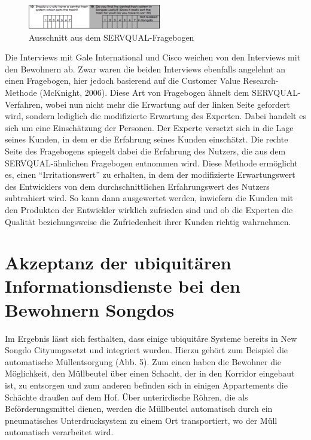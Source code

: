 \documentclass[a4paper,
fontsize=11pt,
oneside,
numbers=noperiodatend,
parskip=half-,
bibliography=totoc,
final
]{scrartcl}
\begin{document}
\begin{figure}[htbp]
\centering
\includegraphics{img/Abbildung3.jpg}
\caption{Ausschnitt aus dem SERVQUAL-Fragebogen}
\end{figure}

Die Interviews mit Gale International und Cisco weichen von den
Interviews mit den Bewohnern ab. Zwar waren die beiden Interviews
ebenfalls angelehnt an einen Fragebogen, hier jedoch basierend auf die
Customer Value Research-Methode (McKnight, 2006). Diese Art von
Fragebogen ähnelt dem SERVQUAL-Verfahren, wobei nun nicht mehr die
Erwartung auf der linken Seite gefordert wird, sondern lediglich die
modifizierte Erwartung des Experten. Dabei handelt es sich um eine
Einschätzung der Personen. Der Experte versetzt sich in die Lage seines
Kunden, in dem er die Erfahrung seines Kunden einschätzt. Die rechte
Seite des Fragebogens spiegelt dabei die Erfahrung des Nutzers, die aus
dem SERVQUAL-ähnlichen Fragebogen entnommen wird. Diese Methode
ermöglicht es, einen \enquote{Irritationswert} zu erhalten, in dem der
modifizierte Erwartungswert des Entwicklers von dem durchschnittlichen
Erfahrungswert des Nutzers subtrahiert wird. So kann dann ausgewertet
werden, inwiefern die Kunden mit den Produkten der Entwickler wirklich
zufrieden sind und ob die Experten die Qualität beziehungsweise die
Zufriedenheit ihrer Kunden richtig wahrnehmen.

\section*{Akzeptanz der ubiquitären Informationsdienste bei den
Bewohnern
Songdos}\label{akzeptanz-der-ubiquituxe4ren-informationsdienste-bei-den-bewohnern-songdos}

Im Ergebnis lässt sich festhalten, dass einige ubiquitäre Systeme
bereits in New Songdo Cityumgesetzt und integriert wurden. Hierzu gehört
zum Beispiel die automatische Müllentsorgung (Abb. 5). Zum einen haben
die Bewohner die Möglichkeit, den Müllbeutel über einen Schacht, der in
den Korridor eingebaut ist, zu entsorgen und zum anderen befinden sich
in einigen Appartements die Schächte draußen auf dem Hof. Über
unterirdische Röhren, die als Beförderungsmittel dienen, werden die
Müllbeutel automatisch durch ein pneumatisches Unterdrucksystem zu einem
Ort transportiert, wo der Müll automatisch verarbeitet wird.
\end{document}
